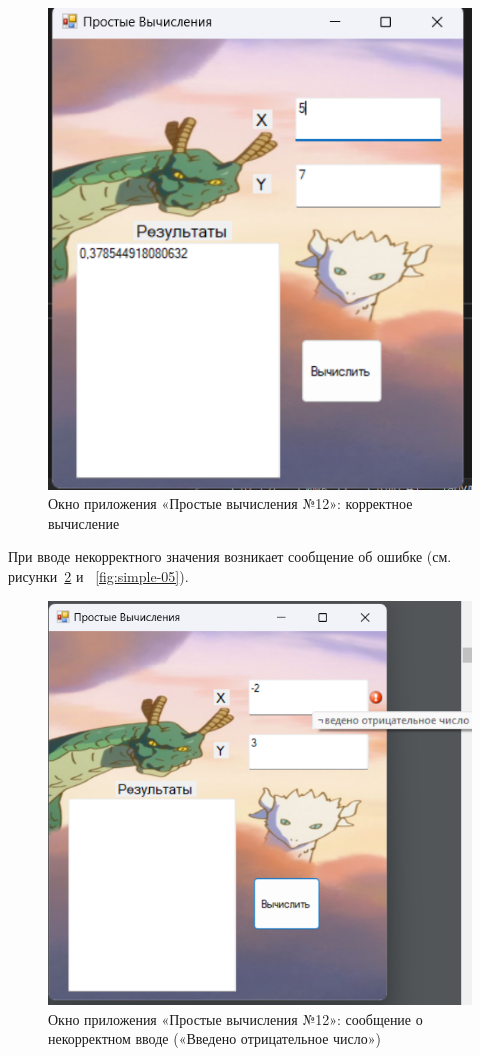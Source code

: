 \documentclass[bachelor, och, pract, times]{SCWorks}
\begin{document}
\begin{figure}[H]
    \centering
    \includegraphics[scale=0.7]{Скрины/Снимок экрана 2025-01-03 215036.png}
    \caption{Окно приложения «Простые вычисления №12»: корректное вычисление}\label{fig:simple-03}
\end{figure}

При вводе некорректного значения возникает сообщение об ошибке (см. рисунки~\ref{fig:simple-04} и ~\ref{fig:simple-05}).

\begin{figure}[H]
    \centering
    \includegraphics[scale=0.7]{Скрины/Снимок экрана 2025-01-03 215135.png}
    \caption{Окно приложения «Простые вычисления №12»: сообщение о некорректном вводе
(«Введено отрицательное число»)}\label{fig:simple-04}
\end{figure}
\end{document}
